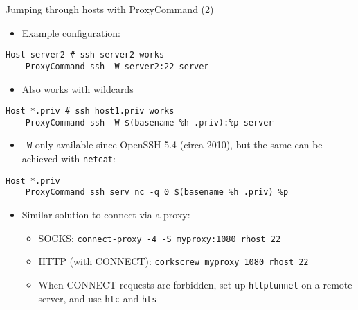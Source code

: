 \documentclass[11pt,final,usepdftitle=false]{beamer}
\begin{document}
\begin{frame}[fragile]{Jumping through hosts with ProxyCommand (2)}
	\hbr
\begin{itemize}
\item Example configuration:
\end{itemize}\vspace{-0.8em}
\begin{lstlisting}[basicstyle=\ttfamily\small,escapeinside={||}]
Host server2 # ssh server2 works
    ProxyCommand ssh -W server2:22 server
\end{lstlisting}\vspace{-0.2em}
\hbr
\begin{itemize}
\item Also works with wildcards
\end{itemize}\vspace{-0.8em}
\begin{lstlisting}[basicstyle=\ttfamily\small,escapeinside={||}]
Host *.priv # ssh host1.priv works
    ProxyCommand ssh -W $(basename %h .priv):%p server
\end{lstlisting}\vspace{-0.2em}
\begin{itemize}
	\item \texttt{-W} only available since OpenSSH 5.4 (circa 2010), but the same can be achieved with \texttt{netcat}:
\end{itemize}\vspace{-0.8em}
\begin{lstlisting}[basicstyle=\ttfamily\small,escapeinside={||}]
Host *.priv
    ProxyCommand ssh serv nc -q 0 $(basename %h .priv) %p
\end{lstlisting}\vspace{-0.2em}
\begin{itemize}
\item Similar solution to connect via a proxy:
\begin{itemize}
	\item SOCKS: \texttt{connect-proxy -4 -S myproxy:1080 rhost 22}
	\item HTTP (with CONNECT): \texttt{corkscrew myproxy 1080 rhost 22}
	\item When CONNECT requests are forbidden, set up \texttt{httptunnel} on a remote server, and use \texttt{htc} and \texttt{hts}
\end{itemize}
\end{itemize}
\end{frame}
\end{document}
